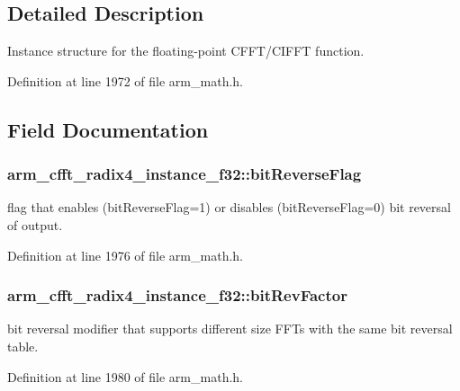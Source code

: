 \subsection{Detailed Description}
Instance structure for the floating-\/point C\-F\-F\-T/\-C\-I\-F\-F\-T function. 

Definition at line 1972 of file arm\-\_\-math.\-h.



\subsection{Field Documentation}
\hypertarget{structarm__cfft__radix4__instance__f32_ac10927a1620195a88649ce63dab66120}{
\subsubsection[{bit\-Reverse\-Flag}]{ arm\-\_\-cfft\-\_\-radix4\-\_\-instance\-\_\-f32\-::bit\-Reverse\-Flag}}\label{structarm__cfft__radix4__instance__f32_ac10927a1620195a88649ce63dab66120}
flag that enables (bit\-Reverse\-Flag=1) or disables (bit\-Reverse\-Flag=0) bit reversal of output. 

Definition at line 1976 of file arm\-\_\-math.\-h.

\hypertarget{structarm__cfft__radix4__instance__f32_acc8cb18a8b901b8321ab9d86491e41a3}{
\subsubsection[{bit\-Rev\-Factor}]{ arm\-\_\-cfft\-\_\-radix4\-\_\-instance\-\_\-f32\-::bit\-Rev\-Factor}}\label{structarm__cfft__radix4__instance__f32_acc8cb18a8b901b8321ab9d86491e41a3}
bit reversal modifier that supports different size F\-F\-Ts with the same bit reversal table. 

Definition at line 1980 of file arm\-\_\-math.\-h.

